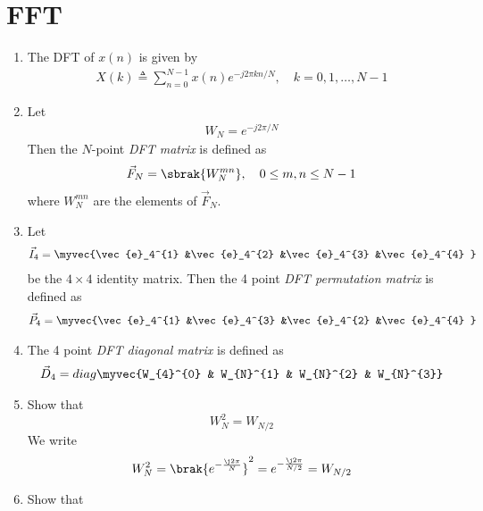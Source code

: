 \documentclass[journal,12pt,twocolumn]{IEEEtran}
\renewcommand\thesection{\arabic{section}}
\begin{document}
\section{FFT}
\begin{enumerate}[label=\arabic*.,ref=\thesection.\theenumi]
    \item The DFT of $x(n)$ is given by
    \begin{align}
        X(k) \triangleq \sum_{n=0}^{N-1} x(n) e^{-j 2 \pi k n / N}, \quad k=0,1, \ldots, N-1
    \end{align}
\item Let 
	\begin{align}
W_{N} = e^{-j2\pi/N} 
	\end{align}
		Then the $N$-point {\em DFT matrix} is defined as 
	\begin{align}
		\vec{F}_{N} = \sbrak{W_{N}^{mn}}, \quad 0 \le m,n \le N-1 
	\end{align}
	where $W_{N}^{mn}$ are the elements of $\vec{F}_{N}$.
\item Let 
	\begin{align}
		\vec{I}_4 = \myvec{\vec{e}_4^{1} &\vec{e}_4^{2} &\vec{e}_4^{3} &\vec{e}_4^{4} }
	\end{align}
		be the $4\times 4$ identity matrix.  Then the 4 point {\em DFT permutation matrix} is defined as 
	\begin{align}
		\vec{P}_4 = \myvec{\vec{e}_4^{1} &\vec{e}_4^{3} &\vec{e}_4^{2} &\vec{e}_4^{4} }
	\end{align}
\item The 4 point {\em DFT diagonal matrix} is defined as 
	\begin{align}
		\vec{D}_4 = diag\myvec{W_{4}^{0} & W_{N}^{1} & W_{N}^{2} & W_{N}^{3}}
	\end{align}
\item Show that 
\begin{equation}
    W_{N}^{2}=W_{N/2}	
\end{equation}
\solution We write
\begin{align}
	W_N^2 = \brak{e^{-\frac{\j2\pi}{N}}}^2 = e^{-\frac{\j2\pi}{N/2}} = W_{N/2}
\end{align}
    \item Show that 

\end{enumerate}
\end{document}
